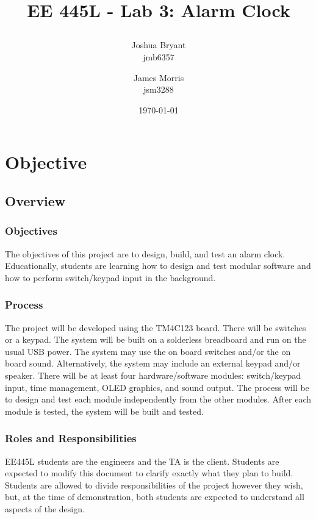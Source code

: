 \documentclass{article}
\title{\begin{LARGE}
	\textbf{EE 445L - Lab 3: Alarm Clock}
\end{LARGE}} %
\author{Joshua Bryant \\ jmb6357 \and James Morris \\ jsm3288} %
\date{\today} %
\begin{document}
\maketitle %


\section{Objective}

	\subsection{Overview}

		\subsubsection{Objectives}
		The objectives of this project are to design, build, and test an alarm clock. Educationally, students are learning how to design and test modular software and how to perform switch/keypad input in the background.

		\subsubsection{Process}
		The project will be developed using the TM4C123 board. There will be switches or a keypad. The system will be built on a solderless breadboard and run on the usual USB power. The system may use the on board switches and/or the on board sound. Alternatively, the system may include an external keypad and/or speaker. There will be at least four hardware/software modules: switch/keypad input, time management, OLED graphics, and sound output. The process will be to design and test each module independently from the other modules. After each module is tested, the system will be built and tested.
	
		\subsubsection{Roles and Responsibilities}
		EE445L students are the engineers and the TA is the client. Students are expected to modify this document to clarify exactly what they plan to build. Students are allowed to divide responsibilities of the project however they wish, but, at the time of demonstration, both students are expected to understand all aspects of the design.
	
\end{document}
